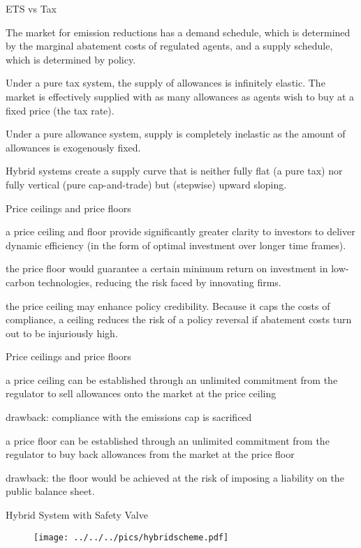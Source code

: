 {ETS vs Tax}
\item<1-> The market for emission
reductions has a demand schedule, which is determined by the marginal abatement costs of
regulated agents, and a supply schedule, which is determined by policy.
\item<2-> Under a pure tax
system, the supply of allowances is infinitely elastic. The market is effectively supplied with as
many allowances as agents wish to buy at a fixed price (the tax rate).
\item<3-> Under a pure allowance
system, supply is completely inelastic as the amount of allowances is exogenously fixed.
\item<4-> Hybrid systems create a supply curve that is neither fully flat (a pure tax) nor fully vertical
(pure cap-and-trade) but (stepwise) upward sloping.

{Price ceilings and price floors}
\item<1-> a price ceiling and floor provide significantly
greater clarity to investors to deliver dynamic efficiency (in the form of optimal investment
over longer time frames).
\item<2-> the price floor would guarantee a certain minimum return on
investment in low-carbon technologies, reducing the risk faced by innovating firms.
\item<3-> the price ceiling may enhance policy credibility. Because it caps the costs of
compliance, a ceiling reduces the risk of a policy reversal if abatement costs turn out to be
injuriously high.

{Price ceilings and price floors}
\item<1-> a price ceiling can be established through an unlimited commitment from the regulator to sell allowances onto the market at the price ceiling
\item<2-> drawback: compliance with the emissions cap is sacrificed
\item<3-> a price floor can be established
through an unlimited commitment from the regulator to buy back
allowances from the market at the price floor
\item<4-> drawback: the floor would be achieved at the risk of
imposing a liability on the public balance sheet.

{Hybrid System with Safety Valve}

\begin{center}
\begin{figure}[h!]
\centering
\texttt{[image: ../../../pics/hybridscheme.pdf]}
\end{figure}
\end{center}

